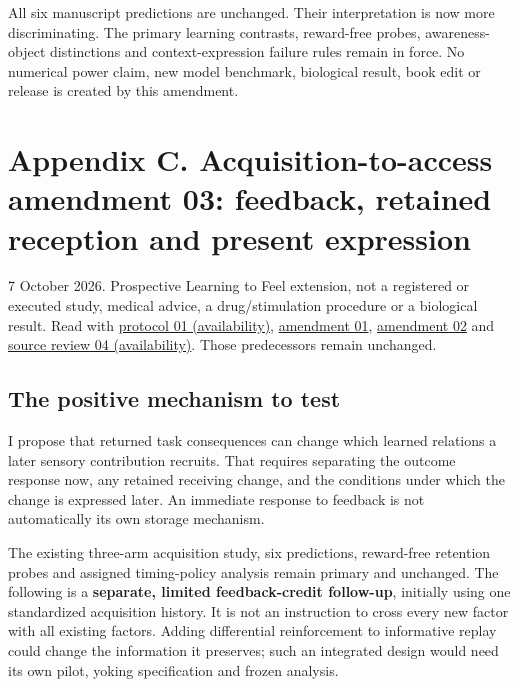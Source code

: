 \documentclass[
  american,
  11pt,
  letterpaper,
]{article}
\begin{document}
All six manuscript predictions are unchanged. Their interpretation is now more discriminating. The primary learning contrasts, reward-free probes, awareness-object distinctions and context-expression failure rules remain in force. No numerical power claim, new model benchmark, biological result, book edit or release is created by this amendment.

\clearpage
\hypertarget{appendix-c}{}

\section{Appendix C. Acquisition-to-access amendment 03: feedback, retained reception and present expression}\label{appendix-c.-acquisition-to-access-amendment-03-feedback-retained-reception-and-present-expression}

7 October 2026. Prospective Learning to Feel extension, not a registered or executed study, medical advice, a drug/stimulation procedure or a biological result. Read with \href{https://github.com/v5ma/v5ma.github.io/blob/master/papers/companions/learning-to-feel-v1.0/ARTIFACT-AVAILABILITY.md\#artifact-1}{protocol 01 (availability)}, \href{https://zenodo.org/records/23455801/files/Learning-to-Feel-Technical-Supplement-v1.1.pdf\#appendix-a}{amendment 01}, \href{https://zenodo.org/records/23455801/files/Learning-to-Feel-Technical-Supplement-v1.1.pdf\#appendix-b}{amendment 02} and \href{https://github.com/v5ma/v5ma.github.io/blob/master/papers/companions/learning-to-feel-v1.0/ARTIFACT-AVAILABILITY.md\#artifact-13}{source review 04 (availability)}. Those predecessors remain unchanged.

\subsection{The positive mechanism to test}\label{the-positive-mechanism-to-test}

I propose that returned task consequences can change which learned relations a later sensory contribution recruits. That requires separating the outcome response now, any retained receiving change, and the conditions under which the change is expressed later. An immediate response to feedback is not automatically its own storage mechanism.

The existing three-arm acquisition study, six predictions, reward-free retention probes and assigned timing-policy analysis remain primary and unchanged. The following is a \textbf{separate, limited feedback-credit follow-up}, initially using one standardized acquisition history. It is not an instruction to cross every new factor with all existing factors. Adding differential reinforcement to informative replay could change the information it preserves; such an integrated design would need its own pilot, yoking specification and frozen analysis.
\end{document}
